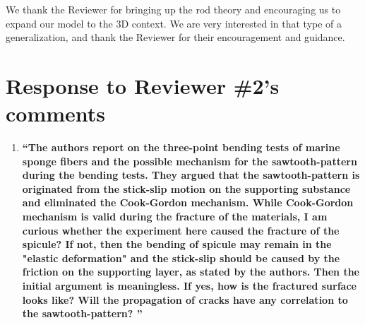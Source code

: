 \documentclass[11pt,letterpaper]{report}
\begin{document}
\begin{enumerate}[label=\textit{1.\arabic*},wide, labelwidth=!, labelindent=0pt]
We thank the Reviewer for bringing up the rod theory and encouraging us to expand our model to the 3D context. We are very interested in that type of a generalization, and thank the Reviewer for their encouragement and guidance.






\clearpage

\section*{Response to Reviewer \#2's comments}
\label{rev2}

\begin{enumerate}[label=\textit{2.\arabic*},wide, labelindent=0pt]

\item \label{r2c1}{\bf ``The authors report on the three-point bending tests of marine sponge fibers and the possible mechanism for the sawtooth-pattern during the bending tests. They argued that the sawtooth-pattern is originated from the stick-slip motion on the supporting substance and eliminated the Cook-Gordon mechanism.
While Cook-Gordon mechanism is valid during the fracture of the materials, I am curious whether the experiment here caused the fracture of the spicule?
If not, then the bending of spicule may remain in the "elastic deformation" and the stick-slip should be caused by the friction on the supporting layer, as stated by the authors. Then the initial argument is meaningless.
If yes, how is the fractured surface looks like? Will the propagation of cracks have any correlation to the sawtooth-pattern? ''}




\end{enumerate}
\end{enumerate}
\end{document}
